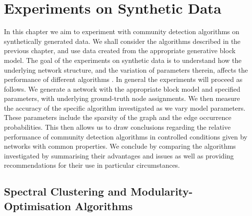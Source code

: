 
\chapter{Experiments on Synthetic Data}

\label{cha:experimentsOnSyntheticData}


In this chapter we aim to experiment with community detection algorithms on synthetically generated data.
We shall consider the algorithms described in the previous chapter, and use data created from the appropriate generative block model.
The goal of the experiments on synthetic data is to understand how the underlying
network structure, and the variation of parameters therein, affects the performance of different algorithms \cite{RLK12}.
In general the experiments will proceed as follows.
We generate a network with the appropriate block model and specified parameters, with underlying ground-truth node assignments.
We then measure the accuracy of the specific algorithm investigated as we vary model parameters.
These parameters include the sparsity of the graph and the edge occurrence probabilities.
This then allows us to draw conclusions regarding the relative performance of community detection algorithms in controlled conditions given by networks with common properties.
We conclude by comparing the algorithms investigated by summarising their advantages and issues as well as providing recommendations for their use in particular circumstances.


\section{Spectral Clustering and Modularity-Optimisation Algorithms}
\label{sec:spectralClusteringModularityOptimisationAlgorithms}

